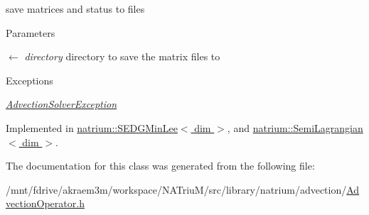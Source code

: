 save matrices and status to files 
\begin{DoxyParams}{Parameters}
\item[\mbox{$\leftarrow$} {\em directory}]directory to save the matrix files to \end{DoxyParams}

\begin{DoxyExceptions}{Exceptions}
\item[{\em \hyperlink{classnatrium_1_1AdvectionSolverException}{AdvectionSolverException}}]\end{DoxyExceptions}


Implemented in \hyperlink{classnatrium_1_1SEDGMinLee_af667cda1a894340f614da67c0a0ae5da}{natrium::SEDGMinLee$<$ dim $>$}, and \hyperlink{classnatrium_1_1SemiLagrangian_aeb3b1dfda8a0d8fe7473716f98b12647}{natrium::SemiLagrangian$<$ dim $>$}.

The documentation for this class was generated from the following file:\begin{DoxyCompactItemize}
\item 
/mnt/fdrive/akraem3m/workspace/NATriuM/src/library/natrium/advection/\hyperlink{AdvectionOperator_8h}{AdvectionOperator.h}\end{DoxyCompactItemize}
